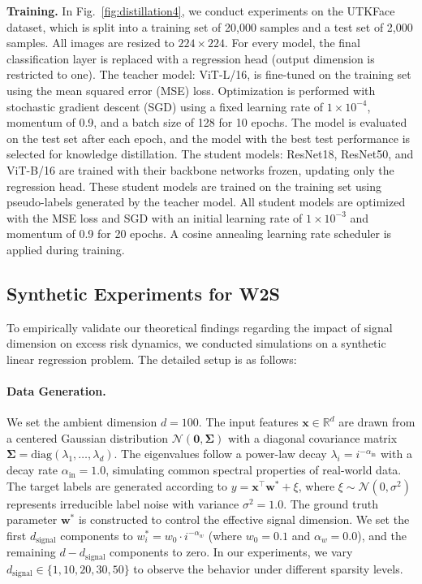 \documentclass{article}
\theoremstyle{definition}
\theoremstyle{definition}
\theoremstyle{plain}
\theoremstyle{plain}
\theoremstyle{plain}
\theoremstyle{plain}
\theoremstyle{plain}
\begin{document}
\textbf{Training.} In Fig.~\ref{fig:distillation4}, we conduct experiments on the UTKFace dataset, which is split into a training set of 20,000 samples and a test set of 2,000 samples. All images are resized to $224 \times 224$. For every model, the final classification layer is replaced with a regression head (output dimension is restricted to one). The teacher model: ViT-L/16, is fine-tuned on the training set using the mean squared error (MSE) loss. Optimization is performed with stochastic gradient descent (SGD) using a fixed learning rate of $1 \times 10^{-4}$, momentum of 0.9, and a batch size of 128 for 10 epochs. The model is evaluated on the test set after each epoch, and the model with the best test performance is selected for knowledge distillation. The student models: ResNet18, ResNet50, and ViT-B/16 are trained with their backbone networks frozen, updating only the regression head. These student models are trained on the training set using pseudo-labels generated by the teacher model. All student models are optimized with the MSE loss and SGD with an initial learning rate of $1 \times 10^{-3}$ and momentum of 0.9 for 20 epochs. A cosine annealing learning rate scheduler is applied during training.



\subsection{Synthetic Experiments for W2S}

To empirically validate our theoretical findings regarding the impact of signal dimension on excess risk dynamics, we conducted simulations on a synthetic linear regression problem. The detailed setup is as follows:

\paragraph{Data Generation.} 
We set the ambient dimension $d = 100$. The input features $\mathbf{x} \in \mathbb{R}^d$ are drawn from a centered Gaussian distribution $\mathcal{N}(\mathbf{0}, \boldsymbol{\Sigma})$ with a diagonal covariance matrix $\boldsymbol{\Sigma} = \text{diag}(\lambda_1, \dots, \lambda_d)$. The eigenvalues follow a power-law decay $\lambda_i = i^{-\alpha_{\text{in}}}$ with a decay rate $\alpha_{\text{in}} = 1.0$, simulating common spectral properties of real-world data.
The target labels are generated according to $y = \mathbf{x}^\top \mathbf{w}^* + \xi$, where $\xi \sim \mathcal{N}(0, \sigma^2)$ represents irreducible label noise with variance $\sigma^2 = 1.0$.
The ground truth parameter $\mathbf{w}^*$ is constructed to control the effective signal dimension. We set the first $d_{\text{signal}}$ components to $w^*_i = w_0 \cdot i^{-\alpha_w}$ (where $w_0=0.1$ and $\alpha_w=0.0$), and the remaining $d - d_{\text{signal}}$ components to zero. In our experiments, we vary $d_{\text{signal}} \in \{1, 10, 20, 30, 50\}$ to observe the behavior under different sparsity levels.
\end{document}
